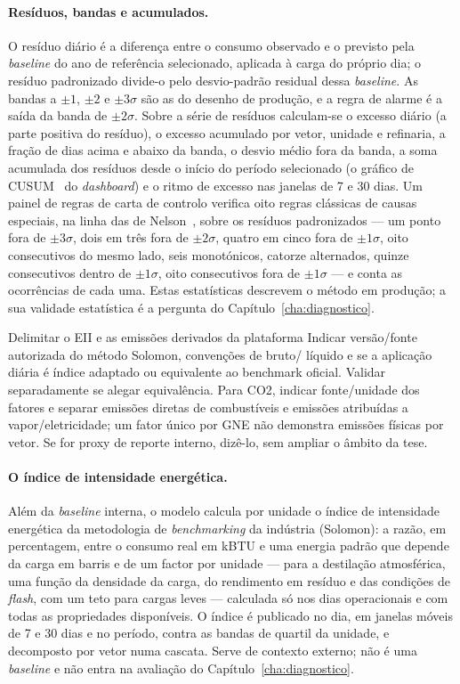 \paragraph{Resíduos, bandas e acumulados.} O resíduo diário é a diferença
entre o consumo observado e o previsto pela \emph{baseline} do ano de
referência selecionado, aplicada à carga do próprio dia; o resíduo
padronizado divide-o pelo desvio-padrão residual dessa \emph{baseline}. As
bandas a $\pm1$, $\pm2$ e $\pm3\sigma$ são as do desenho de produção, e a
regra de alarme é a saída da banda de $\pm2\sigma$. Sobre a série de
resíduos calculam-se o excesso diário (a parte positiva do resíduo), o
excesso acumulado por vetor, unidade e refinaria, a fração de dias acima
e abaixo da banda, o desvio médio fora da banda, a soma acumulada dos
resíduos desde o início do período selecionado (o gráfico de CUSUM~\cite{Page1954} do
\emph{dashboard}) e o ritmo de excesso nas janelas de 7 e 30 dias. Um
painel de regras de carta de controlo verifica oito regras clássicas de
causas especiais, na linha das de Nelson~\cite{Nelson1984}, sobre os resíduos padronizados --- um ponto fora de $\pm3\sigma$, dois em
três fora de $\pm2\sigma$, quatro em cinco fora de $\pm1\sigma$, oito
consecutivos do mesmo lado, seis monotónicos, catorze alternados, quinze
consecutivos dentro de $\pm1\sigma$, oito consecutivos fora de
$\pm1\sigma$ --- e conta as ocorrências de cada uma. Estas estatísticas
descrevem o método em produção; a sua validade estatística é a pergunta
do Capítulo~\ref{cha:diagnostico}.

{Delimitar o EII e as emissões derivados da plataforma}
{Indicar versão/fonte autorizada do método Solomon, convenções de bruto/
líquido e se a aplicação diária é índice adaptado ou equivalente ao
benchmark oficial. Validar separadamente se alegar equivalência. Para
CO2, indicar fonte/unidade dos fatores e separar emissões diretas de
combustíveis e emissões atribuídas a vapor/eletricidade; um fator único
por GNE não demonstra emissões físicas por vetor. Se for proxy de
reporte interno, dizê-lo, sem ampliar o âmbito da tese.}%
\paragraph{O índice de intensidade energética.} Além da \emph{baseline}
interna, o modelo calcula por unidade o índice de intensidade energética
da metodologia de \emph{benchmarking} da indústria (Solomon): a razão,
em percentagem, entre o consumo real em kBTU e uma energia padrão que
depende da carga em barris e de um factor por unidade --- para a
destilação atmosférica, uma função da densidade da carga, do rendimento em
resíduo e das condições de \emph{flash}, com um teto para cargas leves ---
calculada só nos dias operacionais e com todas as propriedades disponíveis.
O índice é publicado no dia, em janelas móveis de 7 e 30 dias e no
período, contra as bandas de quartil da unidade, e decomposto por vetor
numa cascata. Serve de contexto externo; não é uma \emph{baseline} e não
entra na avaliação do Capítulo~\ref{cha:diagnostico}.


